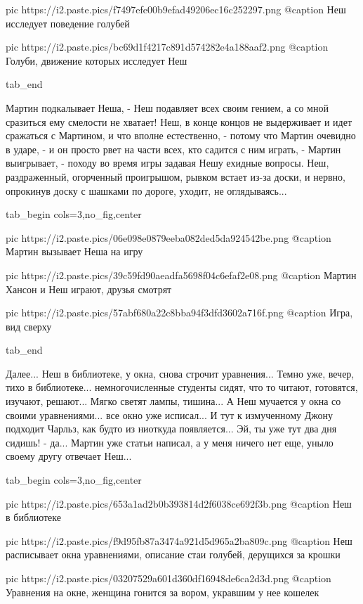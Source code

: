 		 pic https://i2.paste.pics/f7497efe00b9efad49206ec16c252297.png
		 @caption Неш исследует поведение голубей
		 
		 pic https://i2.paste.pics/bc69d1f4217c891d574282e4a188aaf2.png
		 @caption Голуби, движение которых исследует Неш

  tab_end
\fi

Мартин подкалывает Неша, - Неш подавляет всех своим гением, а со мной сразиться
ему смелости не хватает!  Неш, в конце концов не выдерживает и идет сражаться с
Мартином, и что вполне естественно, - потому что Мартин очевидно в ударе, - и
он просто рвет на части всех, кто садится с ним играть, - Мартин выигрывает, -
походу во время игры задавая Нешу ехидные вопросы. Неш, раздраженный,
огорченный проигрышом, рывком встает из-за доски, и нервно, опрокинув доску с
шашками по дороге, уходит, не оглядываясь...

\ifcmt
  tab_begin cols=3,no_fig,center

     pic https://i2.paste.pics/06e098e0879eeba082ded5da924542be.png
		 @caption Мартин вызывает Неша на игру

		 pic https://i2.paste.pics/39c59fd90aeadfa5698f04c6efaf2e08.png
		 @caption Мартин Хансон и Неш играют, друзья смотрят

		 pic https://i2.paste.pics/57abf680a22c8bba94f3dfd3602a716f.png
		 @caption Игра, вид сверху

  tab_end
\fi

Далее... Неш в библиотеке, у окна, снова строчит уравнения... Темно уже, вечер,
тихо в библиотеке... немногочисленные студенты сидят, что то читают, готовятся, изучают,
решают... Мягко светят лампы, тишина... А Неш мучается у окна со своими уравнениями...  все окно уже
исписал... И тут к измученному Джону подходит Чарльз, как будто из ниоткуда
появляется...  Эй, ты уже тут два дня сидишь! - да... Мартин уже статьи
написал, а у меня ничего нет еще, уныло своему другу отвечает Неш... 

\ifcmt
  tab_begin cols=3,no_fig,center

     pic https://i2.paste.pics/653a1ad2b0b393814d2f6038ce692f3b.png
		 @caption Неш в библиотеке

		 pic https://i2.paste.pics/f9d95fb87a3474a921d5d965a2ba809c.png
		 @caption Неш расписывает окна уравнениями, описание стаи голубей, дерущихся за крошки

		 pic https://i2.paste.pics/03207529a601d360df16948de6ca2d3d.png
		 @caption Уравнения на окне, женщина гонится за вором, укравшим у нее кошелек

